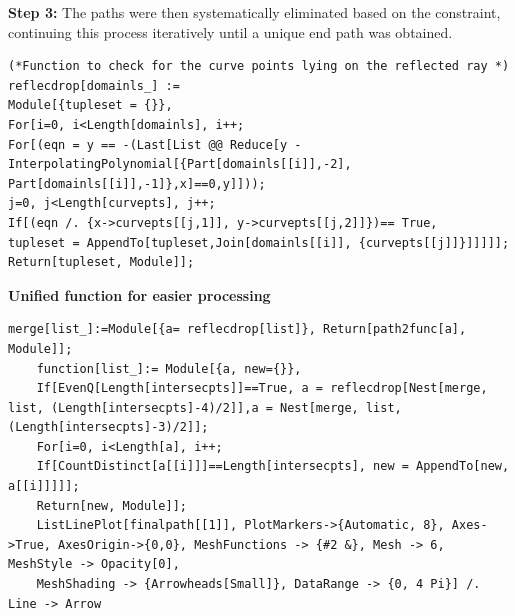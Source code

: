 \documentclass[12pt,a4paper,twoside]{report}
\begin{document}
\textbf{Step 3:} The paths were then systematically eliminated based on the constraint, continuing this process iteratively until a unique end path was obtained.

\begin{lstlisting}[style=mathematica]
(*Function to check for the curve points lying on the reflected ray *)
reflecdrop[domainls_] := 
Module[{tupleset = {}}, 
For[i=0, i<Length[domainls], i++;
For[(eqn = y == -(Last[List @@ Reduce[y - InterpolatingPolynomial[{Part[domainls[[i]],-2], Part[domainls[[i]],-1]},x]==0,y]]));
j=0, j<Length[curvepts], j++;
If[(eqn /. {x->curvepts[[j,1]], y->curvepts[[j,2]]})== True, 
tupleset = AppendTo[tupleset,Join[domainls[[i]], {curvepts[[j]]}]]]]];
Return[tupleset, Module]];
\end{lstlisting}

\textbf{Unified function for easier processing \\}
\begin{lstlisting}[style=mathematica]
	merge[list_]:=Module[{a= reflecdrop[list]}, Return[path2func[a], Module]];
	function[list_]:= Module[{a, new={}},
	If[EvenQ[Length[intersecpts]]==True, a = reflecdrop[Nest[merge, list, (Length[intersecpts]-4)/2]],a = Nest[merge, list, (Length[intersecpts]-3)/2]];
	For[i=0, i<Length[a], i++;
	If[CountDistinct[a[[i]]]==Length[intersecpts], new = AppendTo[new, a[[i]]]]];
	Return[new, Module]];
	ListLinePlot[finalpath[[1]], PlotMarkers->{Automatic, 8}, Axes->True, AxesOrigin->{0,0}, MeshFunctions -> {#2 &}, Mesh -> 6, MeshStyle -> Opacity[0], 
	MeshShading -> {Arrowheads[Small]}, DataRange -> {0, 4 Pi}] /. Line -> Arrow 
\end{lstlisting}
\end{document}

